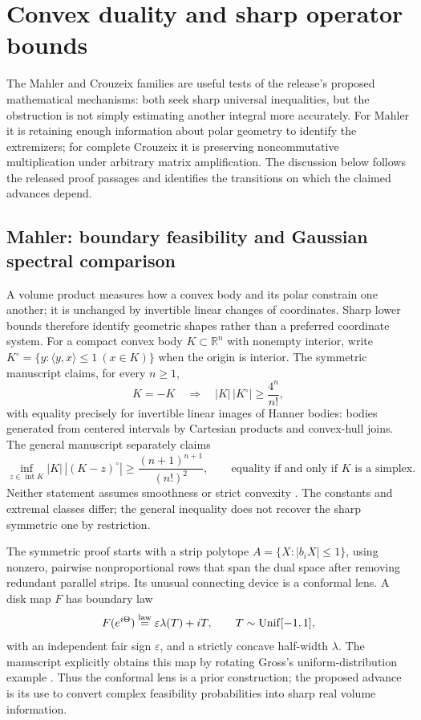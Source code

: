 \section{Convex duality and sharp operator bounds}
\label{sec:geometry-operators}

The Mahler and Crouzeix families are useful tests of the release's proposed
mathematical mechanisms: both seek sharp universal inequalities, but the
obstruction is not simply estimating another integral more accurately.
For Mahler it is retaining enough information about polar geometry to
identify the extremizers; for complete Crouzeix it is preserving
noncommutative multiplication under arbitrary matrix amplification.
The discussion below follows the released proof passages and identifies
the transitions on which the claimed advances depend.

\subsection{Mahler: boundary feasibility and Gaussian spectral comparison}
\label{subsec:go-mahler}

A volume product measures how a convex body and its polar constrain one
another; it is unchanged by invertible linear changes of coordinates.
Sharp lower bounds therefore identify geometric shapes rather than a
preferred coordinate system. For a compact convex body
\(K\subset\mathbb R^n\) with nonempty interior,
write \(K^\circ=\{y:\langle y,x\rangle\le1\ (x\in K)\}\) when the origin is
interior. The symmetric manuscript claims, for every \(n\ge1\),
\[
 K=-K
 \quad\Longrightarrow\quad
 |K|\,|K^\circ|\ge\frac{4^n}{n!},
\]
with equality precisely for invertible linear images of Hanner bodies:
bodies generated from centered intervals by Cartesian products and
convex-hull joins. The general manuscript separately claims
\[
 \inf_{z\in\operatorname{int}K}|K|\,|(K-z)^\circ|
 \ge\frac{(n+1)^{n+1}}{(n!)^2},
 \qquad
 \text{equality if and only if \(K\) is a simplex}.
\]
Neither statement assumes smoothness or strict convexity
\cite{GOOpenAISymmetricMahler2026,GOOpenAIGeneralMahler2026}.
The constants and extremal classes differ; the general inequality does
not recover the sharp symmetric one by restriction.

The symmetric proof starts with a strip polytope
\(A=\{X:|b_iX|\le1\}\), using nonzero, pairwise nonproportional rows
that span the dual space after removing redundant parallel strips.
Its unusual connecting device is a conformal lens. A disk map \(F\)
has boundary law
\[
 F(e^{i\Theta})\overset{\rm law}{=}\varepsilon\lambda(T)+iT,
 \qquad T\sim\operatorname{Unif}[-1,1],
\]
with an independent fair sign \(\varepsilon\), and a strictly concave
half-width \(\lambda\). The manuscript explicitly obtains this map by
rotating Gross's uniform-distribution example
\cite[Section~3.2]{GOGross2019}. Thus the conformal lens is a prior
construction; the proposed advance is its use to convert complex
feasibility probabilities into sharp real volume information.

